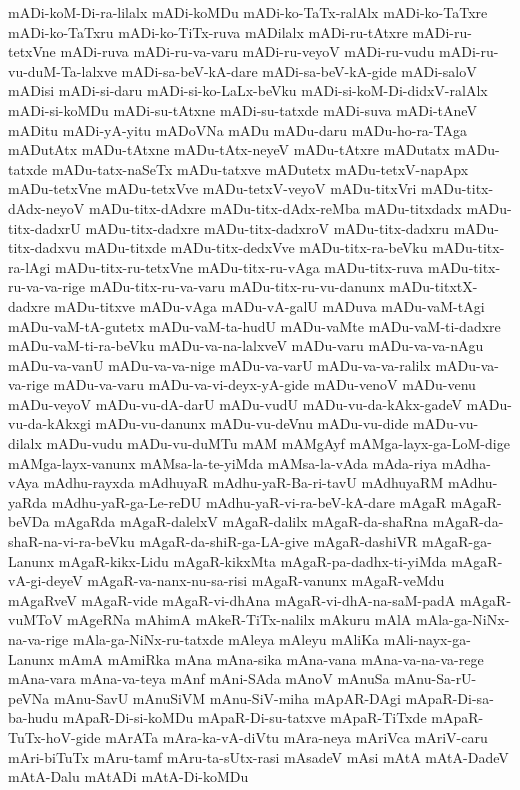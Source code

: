 {mADi-koM-Di-ra-lilalx
mADi-koMDu
mADi-ko-TaTx-ralAlx
mADi-ko-TaTxre
mADi-ko-TaTxru
mADi-ko-TiTx-ruva
mADilalx
mADi-ru-tAtxre
mADi-ru-tetxVne
mADi-ruva
mADi-ru-va-varu
mADi-ru-veyoV
mADi-ru-vudu
mADi-ru-vu-duM-Ta-lalxve
mADi-sa-beV-kA-dare
mADi-sa-beV-kA-gide
mADi-saloV
mADisi
mADi-si-daru
mADi-si-ko-LaLx-beVku
mADi-si-koM-Di-didxV-ralAlx
mADi-si-koMDu
mADi-su-tAtxne
mADi-su-tatxde
mADi-suva
mADi-tAneV
mADitu
mADi-yA-yitu
mADoVNa
mADu
mADu-daru
mADu-ho-ra-TAga
mADutAtx
mADu-tAtxne
mADu-tAtx-neyeV
mADu-tAtxre
mADutatx
mADu-tatxde
mADu-tatx-naSeTx
mADu-tatxve
mADutetx
mADu-tetxV-napApx
mADu-tetxVne
mADu-tetxVve
mADu-tetxV-veyoV
mADu-titxVri
mADu-titx-dAdx-neyoV
mADu-titx-dAdxre
mADu-titx-dAdx-reMba
mADu-titxdadx
mADu-titx-dadxrU
mADu-titx-dadxre
mADu-titx-dadxroV
mADu-titx-dadxru
mADu-titx-dadxvu
mADu-titxde
mADu-titx-dedxVve
mADu-titx-ra-beVku
mADu-titx-ra-lAgi
mADu-titx-ru-tetxVne
mADu-titx-ru-vAga
mADu-titx-ruva
mADu-titx-ru-va-va-rige
mADu-titx-ru-va-varu
mADu-titx-ru-vu-danunx
mADu-titxtX-dadxre
mADu-titxve
mADu-vAga
mADu-vA-galU
mADuva
mADu-vaM-tAgi
mADu-vaM-tA-gutetx
mADu-vaM-ta-hudU
mADu-vaMte
mADu-vaM-ti-dadxre
mADu-vaM-ti-ra-beVku
mADu-va-na-lalxveV
mADu-varu
mADu-va-va-nAgu
mADu-va-vanU
mADu-va-va-nige
mADu-va-varU
mADu-va-va-ralilx
mADu-va-va-rige
mADu-va-varu
mADu-va-vi-deyx-yA-gide
mADu-venoV
mADu-venu
mADu-veyoV
mADu-vu-dA-darU
mADu-vudU
mADu-vu-da-kAkx-gadeV
mADu-vu-da-kAkxgi
mADu-vu-danunx
mADu-vu-deVnu
mADu-vu-dide
mADu-vu-dilalx
mADu-vudu
mADu-vu-duMTu
mAM
mAMgAyf
mAMga-layx-ga-LoM-dige
mAMga-layx-vanunx
mAMsa-la-te-yiMda
mAMsa-la-vAda
mAda-riya
mAdha-vAya
mAdhu-rayxda
mAdhuyaR
mAdhu-yaR-Ba-ri-tavU
mAdhuyaRM
mAdhu-yaRda
mAdhu-yaR-ga-Le-reDU
mAdhu-yaR-vi-ra-beV-kA-dare
mAgaR
mAgaR-beVDa
mAgaRda
mAgaR-dalelxV
mAgaR-dalilx
mAgaR-da-shaRna
mAgaR-da-shaR-na-vi-ra-beVku
mAgaR-da-shiR-ga-LA-give
mAgaR-dashiVR
mAgaR-ga-Lanunx
mAgaR-kikx-Lidu
mAgaR-kikxMta
mAgaR-pa-dadhx-ti-yiMda
mAgaR-vA-gi-deyeV
mAgaR-va-nanx-nu-sa-risi
mAgaR-vanunx
mAgaR-veMdu
mAgaRveV
mAgaR-vide
mAgaR-vi-dhAna
mAgaR-vi-dhA-na-saM-padA
mAgaR-vuMToV
mAgeRNa
mAhimA
mAkeR-TiTx-nalilx
mAkuru
mAlA
mAla-ga-NiNx-na-va-rige
mAla-ga-NiNx-ru-tatxde
mAleya
mAleyu
mAliKa
mAli-nayx-ga-Lanunx
mAmA
mAmiRka
mAna
mAna-sika
mAna-vana
mAna-va-na-va-rege
mAna-vara
mAna-va-teya
mAnf
mAni-SAda
mAnoV
mAnuSa
mAnu-Sa-rU-peVNa
mAnu-SavU
mAnuSiVM
mAnu-SiV-miha
mApAR-DAgi
mApaR-Di-sa-ba-hudu
mApaR-Di-si-koMDu
mApaR-Di-su-tatxve
mApaR-TiTxde
mApaR-TuTx-hoV-gide
mArATa
mAra-ka-vA-diVtu
mAra-neya
mAriVca
mAriV-caru
mAri-biTuTx
mAru-tamf
mAru-ta-sUtx-rasi
mAsadeV
mAsi
mAtA
mAtA-DadeV
mAtA-Dalu
mAtADi
mAtA-Di-koMDu
}
